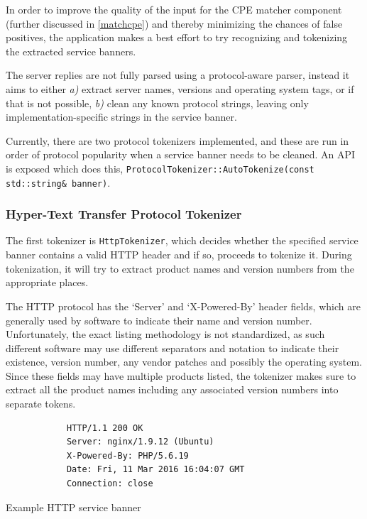 \documentclass[a4paper,12pt]{article}
\begin{document}
	In order to improve the quality of the input for the CPE matcher component (further discussed in \ref{matchcpe}) and thereby minimizing the chances of false positives, the application makes a best effort to try recognizing and tokenizing the extracted service banners.
	
	The server replies are not fully parsed using a protocol-aware parser, instead it aims to either \textit{a)} extract server names, versions and operating system tags, or if that is not possible, \textit{b)} clean any known protocol strings, leaving only implementation-specific strings in the service banner.
	
	Currently, there are two protocol tokenizers implemented, and these are run in order of protocol popularity when a service banner needs to be cleaned. An API is exposed which does this, \texttt{ProtocolTokenizer::AutoTokenize(const std::string& banner)}.
	
\subsubsection{Hyper-Text Transfer Protocol Tokenizer}
 
	
	The first tokenizer is \texttt{HttpTokenizer}, which decides whether the specified service banner contains a valid HTTP header and if so, proceeds to tokenize it. During tokenization, it will try to extract product names and version numbers from the appropriate places.
	
	The HTTP protocol has the `Server' and `X-Powered-By' header fields, which are generally used by software to indicate their name and version number. Unfortunately, the exact listing methodology is not standardized, as such different software may use different separators and notation to indicate their existence, version number, any vendor patches and possibly the operating system. Since these fields may have multiple products listed, the tokenizer makes sure to extract all the product names including any associated version numbers into separate tokens.
	
	\begin{listing}[H]
		\begin{verbatim}
			HTTP/1.1 200 OK
			Server: nginx/1.9.12 (Ubuntu)
			X-Powered-By: PHP/5.6.19
			Date: Fri, 11 Mar 2016 16:04:07 GMT
			Connection: close
		\end{verbatim}
		\caption{Example HTTP service banner}
		\label{httpsvcbnr}
	\end{listing}
	
\end{document}
